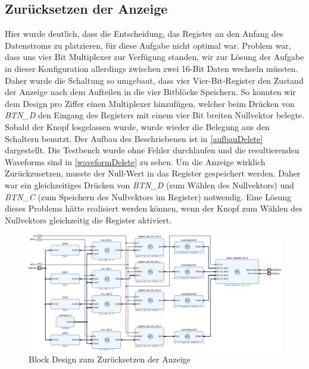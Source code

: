 \documentclass[11pt, a4paper]{article}
\begin{document}
\subsection*{Zurücksetzen der Anzeige}
Hier wurde deutlich, dass die Entscheidung, das Register an den Anfang des Datenstroms zu platzieren, für diese Aufgabe nicht optimal war. Problem war, dass uns vier Bit Multiplexer zur Verfügung standen, wir zur Lösung der Aufgabe in dieser Konfiguration allerdings zwischen zwei 16-Bit Daten wechseln müssten. Daher wurde die Schaltung so umgebaut, dass vier Vier-Bit-Register den Zustand der Anzeige nach dem Aufteilen in die vier Bitblöcke Speichern. So konnten wir dem Design pro Ziffer einen Multiplexer hinzufügen, welcher beim Drücken von \textit{BTN\_D} den Eingang des Registers mit einem vier Bit breiten Nullvektor belegte. Sobald der Knopf losgelassen wurde, wurde wieder die Belegung aus den Schaltern benutzt. 
Der Aufbau des Beschriebenen ist in \autoref{aufbauDelete} dargestellt. Die Testbench wurde ohne Fehler durchlaufen und die resultierenden Waveforms sind in \autoref{waveformDelete} zu sehen.
Um die Anzeige wirklich Zurückzusetzen, musste der Null-Wert in das Register gespeichert werden. Daher war ein gleichzeitiges Drücken von \textit{BTN\_D} (zum Wählen des Nullvektors) und \textit{BTN\_C} (zum Speichern des Nullvektors im Register) notwendig. Eine Lösung dieses Problems hätte realisiert werden können, wenn der Knopf zum Wählen des Nullvektors gleichzeitig die Register aktiviert. 
\begin{figure}[htb]    
    \centering
    \includegraphics[width=\linewidth]{versuch5Data/hierarchical_display_delete.pdf}
    \caption{Block Design zum Zurücksetzen der Anzeige}
    \label{aufbauDelete}        
\end{figure}
\end{document}
